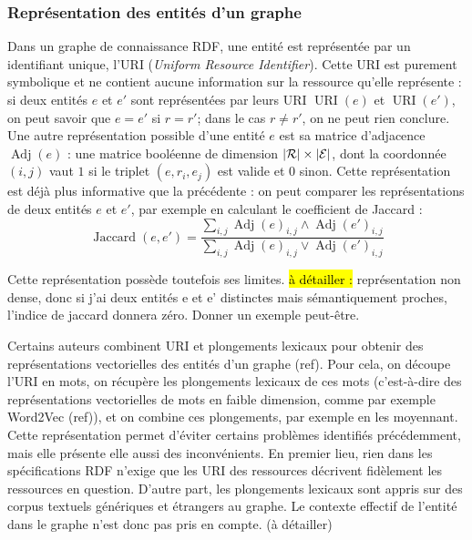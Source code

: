\subsubsection{Représentation des entités d'un graphe}
\newcommand{\URI}{\operatorname{URI}}
\newcommand{\Adja}{\operatorname{Adj}}


Dans un graphe de connaissance RDF, une entité est représentée par un identifiant unique, l'URI (\textit{Uniform Resource Identifier}). 
Cette URI est purement symbolique et ne contient aucune information sur la ressource qu'elle représente : si deux entités $e$ et $e'$ sont représentées par leurs URI $\URI(e)$ et $\URI(e')$, on peut savoir que $e = e'$ si $r=r'$; dans le cas $r \neq r'$, on ne peut rien conclure. Une autre représentation possible d'une entité $e$ est sa matrice d'adjacence $\Adja(e)$ : une matrice booléenne de dimension $|\mathcal{R}|\times |\mathcal{E}|$, dont la coordonnée $(i, j)$ vaut $1$ si le triplet $(e, r_i, e_j)$ est valide et $0$ sinon. Cette représentation est déjà plus informative que la précédente : on peut comparer les représentations de deux entités $e$ et $e'$, par exemple en calculant le coefficient de Jaccard :
\begin{equation}
    \operatorname{Jaccard}(e, e') = \frac{\sum_{i, j} \Adja(e)_{i, j} \land \Adja(e')_{i, j}}{\sum_{i, j} \Adja(e)_{i, j} \lor \Adja(e')_{i, j}}    
\end{equation}

Cette représentation possède toutefois ses limites. \hl{à détailler :} représentation non dense, donc si j'ai deux entités e et e' distinctes mais sémantiquement proches, l'indice de jaccard donnera zéro. Donner un exemple peut-être. %

Certains auteurs combinent URI et plongements lexicaux pour obtenir des représentations vectorielles des entités d'un graphe (ref). Pour cela, on découpe l'URI en mots, on récupère les plongements lexicaux de ces mots (c'est-à-dire des représentations vectorielles de mots en faible dimension, comme par exemple Word2Vec (ref)), et on combine ces plongements, par exemple en les moyennant. Cette représentation permet d'éviter certains problèmes identifiés précédemment, mais elle présente elle aussi des inconvénients. En premier lieu, rien dans les spécifications RDF n'exige que les URI des ressources décrivent fidèlement les ressources en question. D'autre part, les plongements lexicaux sont appris sur des corpus textuels génériques et étrangers au graphe. Le contexte effectif de l'entité dans le graphe n'est donc pas pris en compte. (à détailler)

